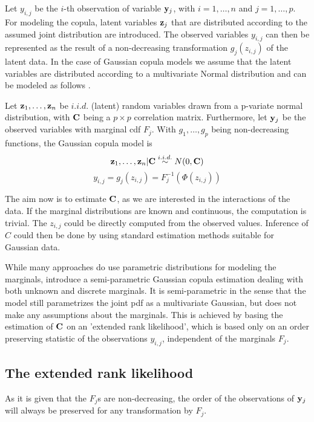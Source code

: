 Let $y_{i,j}$ be the $i$-th observation of variable $\mathbf{y}_j$, with $i=1,\dots,n$ and $j=1,\dots,p$.
For modeling the copula, latent variables $\mathbf{z}_j$ that are distributed according to the assumed joint distribution are introduced. 
The observed variables $y_{i,j}$ can then be represented as the result of a non-decreasing transformation $g_j(z_{i,j})$ of the latent data.
In the case of Gaussian copula models we assume that the latent variables are distributed according to a multivariate Normal distribution and can be modeled as follows
\citep{hoff2009first}.
\begin{tcolorbox}[colback=yellow!5!white,colframe=yellow!75!black, title=Gaussian Copula: Latent Normal Model]
	Let $\mathbf{z}_1, \dots, \mathbf{z}_n$ be $i.i.d.$ (latent) random variables drawn from a p-variate normal distribution, with $\mathbf{C}$ being a $p\times p$ correlation matrix.
	Furthermore, let $\mathbf{y}_j$ be the observed variables with marginal \gls{cdf} $F_j$. 
	With $g_1,\dots,g_p$ being non-decreasing functions, the Gaussian copula model is
	\begin{equation}
		\label{eq:gauss_copula}
		\mathbf{z}_1, \dots, \mathbf{z}_n | \mathbf{C} \overset{i.i.d.}{\sim}  N(0, \mathbf{C})
	\end{equation}
	$$
	y_{i,j} = g_j(z_{i,j}) = F_j^{-1}(\Phi(z_{i,j}))
	$$
\end{tcolorbox}
The aim now is to estimate $\mathbf{C}$, as we are interested in the interactions of the data. 
If the marginal distributions are known and continuous, the computation is trivial. 
The $z_{i,j}$ could be directly computed from the observed values. 
Inference of $C$ could then be done by using standard estimation methods suitable for Gaussian data.

While many approaches do use parametric distributions for modeling the marginals,
\citet{2007extending} introduce a semi-parametric Gaussian copula estimation dealing with both unknown and discrete marginals.
It is semi-parametric in the sense that the model still parametrizes the joint \gls{pdf} as a multivariate Gaussian, but does not make any assumptions about the marginals.
This is achieved by basing the estimation of $\mathbf{C}$ on an 'extended rank likelihood', which is based only on an order preserving statistic of the observations $y_{i,j}$, independent of the marginals $F_j$.


\subsection{The extended rank likelihood}
As it is given that the $F_j$s are non-decreasing, the order of the observations of $\mathbf{y}_j$ will always be preserved for any transformation by $F_j$.

